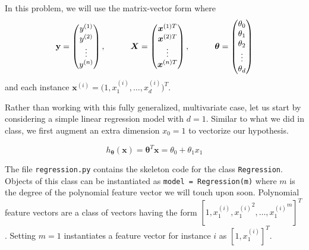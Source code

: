 \documentclass[11pt]{article}
\begin{document}
In this problem, we will use the matrix-vector form where
\begin{equation*}
{\mathbf y} =\begin{pmatrix}
y^{(1)}\\
y^{(2)}\\
\vdots\\
y^{(n)}
\end{pmatrix},
\quad \quad \quad
\boldsymbol{X} = \begin{pmatrix}
\boldsymbol{x}^{(1)T} \\
\boldsymbol{x}^{(2)T}  \\
\vdots  \\
\boldsymbol{x}^{(n)T}  \\
\end{pmatrix},
\quad \quad \quad
\boldsymbol{\theta} = \begin{pmatrix}
\theta_0\\
\theta_1\\
\theta_2\\
\vdots\\
\theta_d
\end{pmatrix}
\end{equation*}
and each instance $\boldsymbol{x}^{(i)} = \bigl( 1, x^{(i)}_{1}, \ldots, x^{(i)}_{d} \bigr)^T$. 

Rather than working with this fully generalized, multivariate case, let us start by considering a simple linear regression model with $d=1$. Similar to what we did in class, we first augment an extra dimension $x_0=1$ to vectorize our hypothesis.

\begin{equation*}
h_{\boldsymbol{\theta}}(\boldsymbol{x}) = \boldsymbol{\theta}^T \boldsymbol{x} = \theta_0 + \theta_1 x_1 
\end{equation*}


The file \verb|regression.py| contains the skeleton code for the class \verb|Regression|. Objects of this class can be instantiated as \verb|model = Regression(m)| where $m$ is the degree of the polynomial feature vector we will touch upon soon. Polynomial feature vectors are a class of vectors having the form $[ 1, x^{(i)}_{1}, {x^{(i)}_{1}}^2, \ldots, {x^{(i)}_{1}}^{m} ]^T$. Setting $m=1$ instantiates a feature vector for instance $i$ as $[ 1, x_{1}^{(i)}]^T$. 
\end{document}
